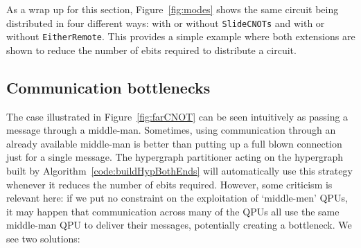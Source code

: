 

As a wrap up for this section, Figure~\ref{fig:modes} shows the same circuit being distributed in four different ways: with or without \texttt{SlideCNOTs} and with or without \texttt{EitherRemote}. This provides a simple example where both extensions are shown to reduce the number of ebits required to distribute a circuit.

\subsection{Communication bottlenecks}
\label{Bottleneck}

The case illustrated in Figure~\ref{fig:farCNOT} can be seen intuitively as passing a message through a middle-man. Sometimes, using communication through an already available middle-man is better than putting up a full blown connection just for a single message. The hypergraph partitioner acting on the hypergraph built by Algorithm~\ref{code:buildHypBothEnds} will automatically use this strategy whenever it reduces the number of ebits required. However, some criticism is relevant here: if we put no constraint on the exploitation of `middle-men' QPUs, it may happen that communication across many of the QPUs all use the same middle-man QPU to deliver their messages, potentially creating a bottleneck. We see two solutions:



